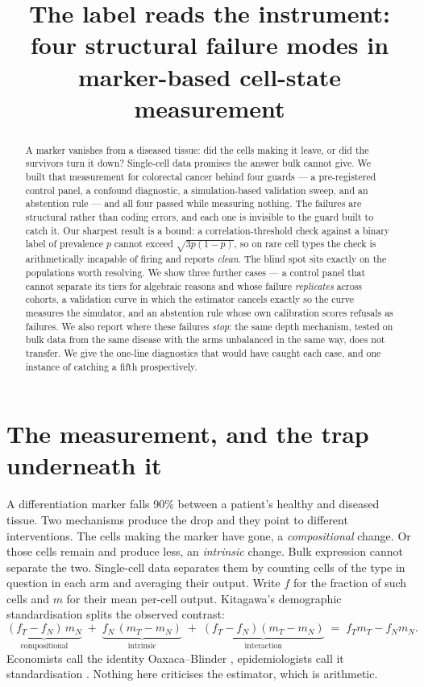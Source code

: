 \documentclass{article}
\title{The label reads the instrument:\\
four structural failure modes in marker-based cell-state measurement}
\author{}
\begin{document}
\maketitle

\begin{abstract}
A marker vanishes from a diseased tissue: did the cells making it leave, or did
the survivors turn it down? Single-cell data promises the answer bulk cannot
give. We built that measurement for colorectal cancer behind four guards --- a
pre-registered control panel, a confound diagnostic, a simulation-based
validation sweep, and an abstention rule --- and all four passed while measuring
nothing. The failures are structural rather than coding errors, and each one is
invisible to the guard built to catch it. Our sharpest result is a bound: a
correlation-threshold check against a binary label of prevalence $p$ cannot
exceed $\sqrt{3p(1-p)}$, so on rare cell types the check is arithmetically
incapable of firing and reports \emph{clean}. The blind spot sits exactly on the
populations worth resolving. We show three further cases --- a control panel that
cannot separate its tiers for algebraic reasons and whose failure
\emph{replicates} across cohorts, a validation curve in which the estimator
cancels exactly so the curve measures the simulator, and an abstention rule whose
own calibration scores refusals as failures. We also report where these failures
\emph{stop}: the same depth mechanism, tested on bulk data from the same disease
with the arms unbalanced in the same way, does not transfer. We give the
one-line diagnostics that would have caught each case, and one instance of
catching a fifth prospectively.
\end{abstract}

\section{The measurement, and the trap underneath it}
\label{sec:intro}

A differentiation marker falls 90\% between a patient's healthy and diseased
tissue. Two mechanisms produce the drop and they point to different
interventions. The cells making the marker have gone, a \emph{compositional}
change. Or those cells remain and produce less, an \emph{intrinsic} change. Bulk
expression cannot separate the two. Single-cell data separates them by counting
cells of the type in question in each arm and averaging their output. Write $f$
for the fraction of such cells and $m$ for their mean per-cell output. Kitagawa's
demographic standardisation \citep{kitagawa1955} splits the observed contrast:
\begin{equation}
\underbrace{(f_T - f_N)\, m_N}_{\text{compositional}} \;+\;
\underbrace{f_N\, (m_T - m_N)}_{\text{intrinsic}} \;+\;
\underbrace{(f_T - f_N)(m_T - m_N)}_{\text{interaction}}
\;=\; f_T m_T - f_N m_N .
\label{eq:kitagawa}
\end{equation}
Economists call the identity Oaxaca--Blinder \citep{oaxaca1973,blinder1973},
epidemiologists call it standardisation \citep{kline2011}. Nothing here
criticises the estimator, which is arithmetic.
\end{document}
